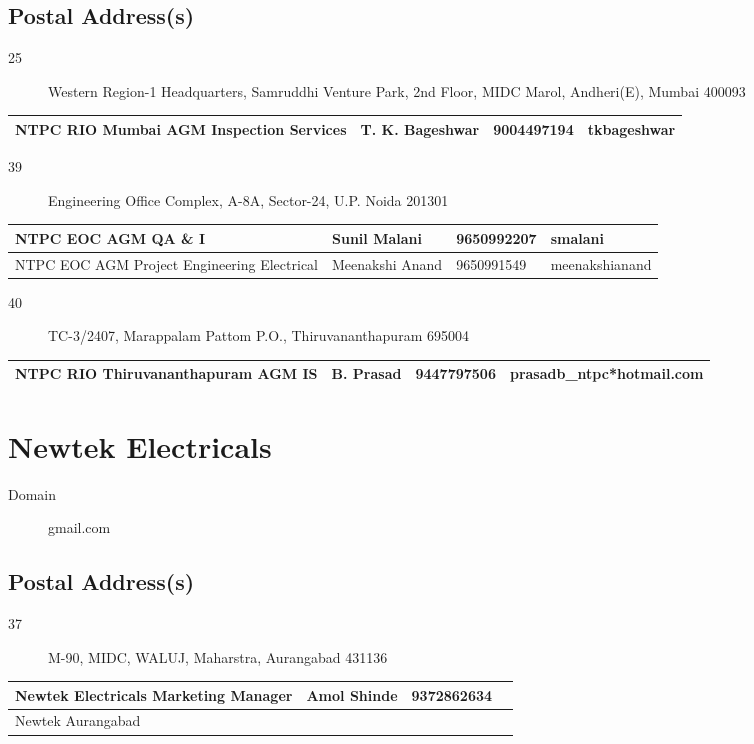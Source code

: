 \documentclass[a4paper, 11pt, twoside]{book}
\begin{document}
\subsection*{Postal Address(s)}
\begin{description}
\item [25]Western Region-1 Headquarters, Samruddhi Venture Park, 2nd Floor, MIDC Marol, Andheri(E), Mumbai 400093
\end{description}
\begin{tabular}{|p{4cm}|p{2cm}|p{2cm}|p{3cm}|}
\hline
NTPC RIO Mumbai AGM Inspection Services & T. K. Bageshwar & 9004497194 & tkbageshwar \\ \hline
\end{tabular}
\begin{description}
\item [39]Engineering Office Complex, A-8A, Sector-24, U.P. Noida 201301
\end{description}
\begin{tabular}{|p{4cm}|p{2cm}|p{2cm}|p{3cm}|}
\hline
NTPC EOC AGM QA \& I & Sunil Malani & 9650992207 & smalani \\ \hline
NTPC EOC AGM Project Engineering Electrical & Meenakshi Anand & 9650991549 & meenakshianand \\ \hline
\end{tabular}
\begin{description}
\item [40]TC-3/2407, Marappalam Pattom P.O., Thiruvananthapuram 695004
\end{description}
\begin{tabular}{|p{4cm}|p{2cm}|p{2cm}|p{3cm}|}
\hline
NTPC RIO Thiruvananthapuram AGM IS & B. Prasad & 9447797506 & prasadb\_ntpc*hotmail.com \\ \hline
\end{tabular}
\section{Newtek Electricals}\label{com:28}
\begin{description}
\item[Domain]gmail.com
\end{description}
\subsection*{Postal Address(s)}
\begin{description}
\item [37]M-90, MIDC, WALUJ, Maharstra, Aurangabad 431136
\end{description}
\begin{tabular}{|p{4cm}|p{2cm}|p{2cm}|p{3cm}|}
\hline
Newtek Electricals Marketing Manager & Amol Shinde & 9372862634 &  \\ \hline
Newtek Aurangabad & & &  \\ \hline
\end{tabular}
\end{document}
